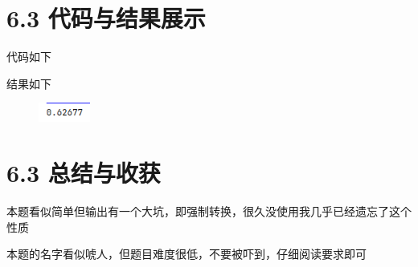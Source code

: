 \section{6.3 代码与结果展示}

代码如下



结果如下

\begin{figure}[H]
    \centering
    \includegraphics[width = 0.15\textwidth]{../pic/6/6.1.png}    
\end{figure}

\section{6.3 总结与收获}

本题看似简单但输出有一个大坑，即强制转换，很久没使用我几乎已经遗忘了这个性质

本题的名字看似唬人，但题目难度很低，不要被吓到，仔细阅读要求即可